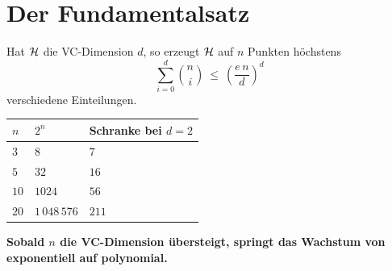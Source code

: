 \section{Der Fundamentalsatz}

\begin{merksatz}
Hat $\mathcal{H}$ die VC-Dimension $d$, so erzeugt $\mathcal{H}$ auf $n$ Punkten höchstens
\[ \sum_{i=0}^{d}\binom{n}{i} \ \le\ \left(\frac{e\,n}{d}\right)^{d} \]
verschiedene Einteilungen.

\begin{center}
{\small
\renewcommand{\arraystretch}{1.46}
\begin{tabular}{@{}P{1.4cm}P{2.2cm}P{3.0cm}@{}}
\toprule
$n$ & $2^{n}$ & \textbf{Schranke bei $d = 2$}\\
\midrule
$3$ & $8$ & $7$\\
$5$ & $32$ & $16$\\
$10$ & $1024$ & $56$\\
$20$ & $1\,048\,576$ & $211$\\
\bottomrule
\end{tabular}}
\end{center}

\begin{center}
\begin{minipage}{0.9\textwidth}
\textbf{Sobald $n$ die VC-Dimension übersteigt, springt das Wachstum von exponentiell auf polynomial.}
\end{minipage}
\end{center}

\begin{center}
\begin{minipage}{0.88\textwidth}
\end{minipage}
\end{center}
\end{merksatz}


